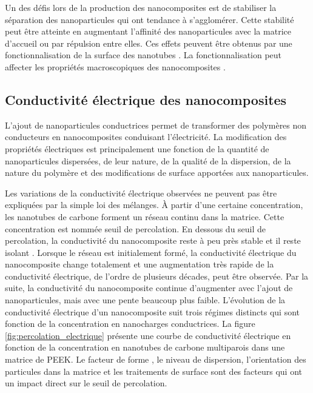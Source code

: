 Un des défis lors de la production des nanocomposites est de stabiliser la séparation des nanoparticules qui ont tendance à s’agglomérer.
Cette stabilité peut être atteinte en augmentant l'affinité des nanoparticules avec la matrice d'accueil ou par répulsion entre elles. 
Ces effets peuvent être obtenus par une fonctionnalisation de la surface des nanotubes \cite{Xie2005}. 
La fonctionnalisation peut affecter les propriétés macroscopiques des nanocomposites \cite{Ma2008}. 

\subsection{Conductivité électrique des nanocomposites}

L'ajout de nanoparticules conductrices permet de transformer des polymères non conducteurs en nanocomposites conduisant l'électricité. 
La modification des propriétés électriques est principalement une fonction de la quantité de nanoparticules dispersées, de leur nature, de la qualité de la dispersion, de la nature du polymère et des modifications de surface apportées aux nanoparticules. 

Les variations de la conductivité électrique observées ne peuvent pas être expliquées par la simple loi des mélanges. 
À partir d'une certaine concentration, les nanotubes de carbone forment un réseau continu dans la matrice. 
Cette concentration est nommée seuil de percolation.
En dessous du seuil de percolation, la conductivité du nanocomposite reste à peu près stable et il reste isolant \cite{Bangarusampath2009}. 
Lorsque le réseau est initialement formé, la conductivité électrique du nanocomposite change totalement et une augmentation très rapide de la conductivité électrique, de l'ordre de plusieurs décades, peut être observée. 
Par la suite, la conductivité du nanocomposite continue d'augmenter avec l'ajout de nanoparticules, mais avec une pente beaucoup plus faible. 
L'évolution de la conductivité électrique d'un nanocomposite suit trois régimes distincts qui sont fonction de la concentration en nanocharges conductrices. 
La figure \ref{fig:percolation_electrique} présente une courbe de conductivité électrique en fonction de la concentration en nanotubes de carbone multiparois dans une matrice de PEEK. 
Le facteur de forme \cite{Hu2008}, le niveau de dispersion, l'orientation des particules dans la matrice \cite{Xie2011c} et les traitements de surface sont des facteurs qui ont un impact direct sur le seuil de percolation. 

